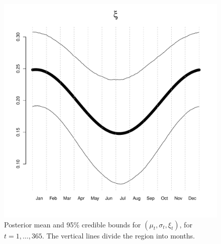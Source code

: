 \documentclass[12pt]{article}
\begin{document}
\begin{figure}[H]
\begin{center}
\includegraphics[scale=0.22]{../figs/post_ksi.pdf}
\end{center}
\caption{Posterior mean and 95\% credible bounds for $(\mu_t,\sigma_t,\xi_t)$, for $t=1,\ldots,365$. The vertical lines divide the region into months.}
\end{figure}
\end{document}
